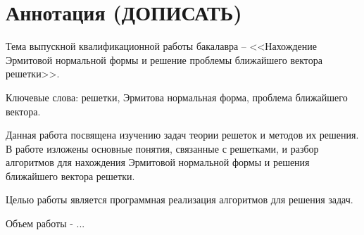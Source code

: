 \newpage
\setcounter{page}{2}

\section*{Аннотация (ДОПИСАТЬ)}

Тема выпускной квалификационной работы бакалавра -- <<Нахождение Эрмитовой нормальной формы и решение проблемы ближайшего вектора решетки>>.

Ключевые слова: решетки, Эрмитова нормальная форма, проблема ближайшего вектора.

Данная работа посвящена изучению задач теории решеток и методов их решения. В работе изложены основные понятия, связанные с решетками, и разбор алгоритмов для нахождения Эрмитовой нормальной формы и решения ближайшего вектора решетки. 

Целью работы является программная реализация алгоритмов для решения задач.

Объем работы - ...

\clearpage